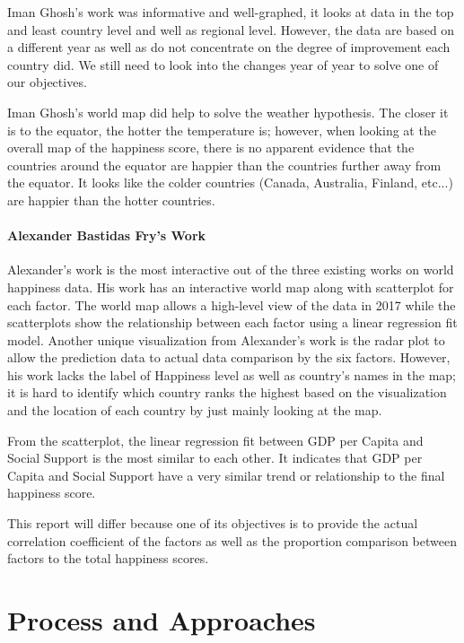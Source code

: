 \documentclass[11pt,twocolumn]{article}
\begin{document}
Iman Ghosh's work was informative and well-graphed, it looks at data in the top and least country level and well as regional level. However, the data are based on a different year as well as do not concentrate on the degree of improvement each country did. We still need to look into the changes year of year to solve one of our objectives. 

Iman Ghosh's world map did help to solve the weather hypothesis. The closer it is to the equator, the hotter the temperature is; however, when looking at the overall map of the happiness score, there is no apparent evidence that the countries around the equator are happier than the countries further away from the equator. It looks like the colder countries (Canada, Australia, Finland, etc...) are happier than the hotter countries. 

\paragraph{Alexander Bastidas Fry's Work \cite{alexander-bastidas-fry}} Alexander's work is the most interactive out of the three existing works on world happiness data. His work has an interactive world map along with scatterplot for each factor. The world map allows a high-level view of the data in 2017 while the scatterplots show the relationship between each factor using a linear regression fit model. Another unique visualization from Alexander's work is the radar plot to allow the prediction data to actual data comparison by the six factors. However, his work lacks the label of Happiness level as well as country's names in the map; it is hard to identify which country ranks the highest based on the visualization and the location of each country by just mainly looking at the map. 

From the scatterplot, the linear regression fit between GDP per Capita and Social Support is the most similar to each other. It indicates that GDP per Capita and Social Support have a very similar trend or relationship to the final happiness score.

This report will differ because one of its objectives is to provide the actual correlation coefficient of the factors as well as the proportion comparison between factors to the total happiness scores.

\section{Process and Approaches}
\end{document}
